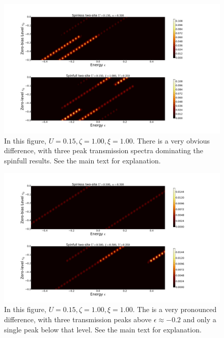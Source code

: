\begin{figure}[h]
    \centering
    \includegraphics[height=.38\textheight]{pdf/map/transmap_u2_k2.pdf}
    \caption{In this figure, $U=0.15, \zeta=1.00, \xi=1.00$. There is a very obvious difference, with three peak transmission spectra dominating the spinfull results. See the main text for explanation.}
    \label{fig:transmap22}
\end{figure}
\begin{figure}[h]
    \centering
    \includegraphics[height=.38\textheight]{pdf/map/transmap_u3_k3.pdf}
    \caption{In this figure, $U=0.15, \zeta=1.00, \xi=1.00$. The is a very pronounced difference, with three transmission peaks above $\epsilon\approx -0.2$ and only a single peak below that level.  See the main text for explanation.}
    \label{fig:transmap31}
\end{figure}

